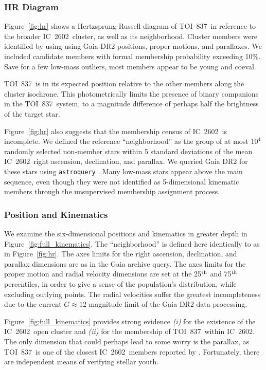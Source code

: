 \documentclass[12pt,twocolumn,tighten]{aastex62}
\newcommand{\tn}{TOI~837} %
\newcommand{\cn}{IC~2602} %
\begin{document}
\subsubsection{HR Diagram}

Figure~\ref{fig:hr} shows a Hertzsprung-Russell diagram of \tn\ in
reference to the broader \cn\ cluster, as well as its neighborhood.
Cluster members were identified by \citet{cantatgaudin_gaia_2018}
using using Gaia-DR2 positions, proper motions, and parallaxes.  
We included candidate members with formal membership probability
exceeding 10\%.  Save for a few low-mass outliers, most members appear
to be young and coeval.

\tn\ is in its expected position relative to the other members along
the cluster isochrone.  This photometrically limits the presence of
binary companions in the \tn\ system, to a magnitude difference of
perhaps half the brightness of the target star.

Figure~\ref{fig:hr} also suggests that the membership census of \cn\
is incomplete.  We defined the reference ``neighborhood'' as the group
of at most $10^4$ randomly selected non-member stars within 5 standard
deviations of the mean \cn\ right ascension, declination, and
parallax.  We queried Gaia DR2 for these stars using
\texttt{astroquery} \citep{astroquery_2018}.  Many low-mass stars
appear above the main sequence, even though they were not identified
as 5-dimensional kinematic members through the unsupervised
\citet{cantat-gaudin_gaia_2018} membership assignment process.


\subsubsection{Position and Kinematics}

We examine the six-dimensional positions and kinematics in greater
depth in Figure~\ref{fig:full_kinematics}.  The ``neighborhood'' is
defined here identically to as in Figure~\ref{fig:hr}.  The axes
limits for the right ascension, declination, and parallax dimensions
are as in the Gaia archive query.  The axes limits for the proper
motion and radial velocity dimensions are set at the 25$^{\rm th}$ and
75$^{\rm th}$ percentiles, in order to give a sense of the
population's distribution, while excluding outlying points.  The
radial velocities suffer the greatest incompleteness due to the
current $G\approx12$ magnitude limit of the Gaia-DR2 data processing.

Figure~\ref{fig:full_kinematics} provides strong evidence {\it (i)} for the
existence of the \cn\ open cluster and {\it (ii)} for the membership
of \tn\ within \cn.
The only dimension that could perhaps lead to some worry is the
parallax, as \tn\ is one of the closest \cn\ members reported by
\citet{cantatgaudin_gaia_2018}.
Fortunately, there are independent means of verifying stellar youth.
\end{document}
